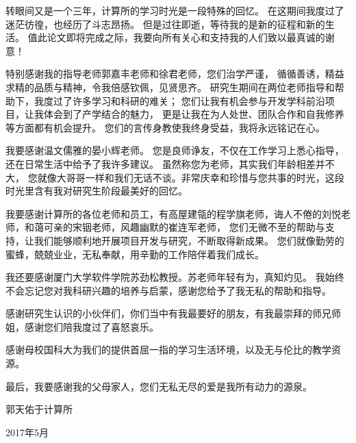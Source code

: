 
\begin{ack}
转眼间又是一个三年，计算所的学习时光是一段特殊的回忆。
在这期间我度过了迷茫彷徨，也经历了斗志昂扬。
但是过往即逝，等待我的是新的征程和新的生活。
值此论文即将完成之际，我要向所有关心和支持我的人们致以最真诚的谢意！

特别感谢我的指导老师郭嘉丰老师和徐君老师，您们治学严谨，
循循善诱，精益求精的品质与精神，令我倍感钦佩，见贤思齐。
研究生期间在两位老师指导和帮助下，我度过了许多学习和科研的难关；
您们让我有机会参与开发学科前沿项目，让我体会到了产学结合的魅力，
更是让我在为人处世、团队合作和自我修养等方面都有机会提升。
您们的言传身教使我终身受益，我将永远铭记在心。

我要感谢温文儒雅的晏小辉老师。
您是良师诤友，不仅在工作学习上悉心指导，还在日常生活中给予了我许多建议。
虽然称您为老师，其实我们年龄相差并不大，
您就像大哥哥一样和我们无话不谈。非常庆幸和珍惜与您共事的时光，这段时光里含有我对研究生阶段最美好的回忆。

我要感谢计算所的各位老师和员工，有高屋建瓴的程学旗老师，诲人不倦的刘悦老师，和蔼可亲的宋铟老师，风趣幽默的崔连军老师，
您们无微不至的帮助与支持，让我们能够顺利地开展项目开发与研究，不断取得新成果。
您们就像勤劳的蜜蜂，兢兢业业，无私奉献，用辛勤的工作陪伴着我们成长。

我还要感谢厦门大学软件学院苏劲松教授。苏老师年轻有为，真知灼见。
我始终不会忘记您对我科研兴趣的培养与启蒙，感谢您给予了我无私的帮助和指导。

感谢研究生认识的小伙伴们，你们当中有我最要好的朋友，有我最崇拜的师兄师姐，感谢您们陪我度过了喜怒哀乐。

感谢母校国科大为我们的提供首屈一指的学习生活环境，以及无与伦比的教学资源。

最后，我要感谢我的父母家人，您们无私无尽的爱是我所有动力的源泉。

\begin{flushright}
郭天佑于计算所

2017年5月 
\end{flushright}
\end{ack}
